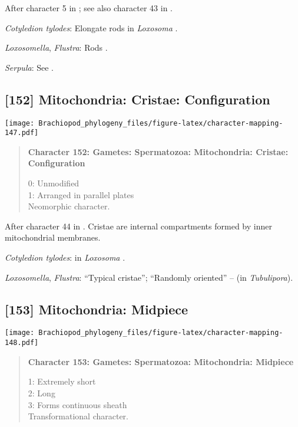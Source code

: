 \documentclass[openany]{book}
\theoremstyle{definition}
\theoremstyle{definition}
\theoremstyle{definition}
\theoremstyle{remark}
\begin{document}
After character 5 in \citet{BucklandNicks2008}; see also character 43 in
\citet{Ponder1997}.

\hypertarget{Cotyledion_tylodes-coding-151}{}
\emph{Cotyledion tylodes}: Elongate rods in \emph{Loxosoma}
\citep{Franzen2000}.

\hypertarget{Flustra-coding-151}{}
\emph{Loxosomella}, \emph{Flustra}: Rods \citep{Franzen1981}.

\hypertarget{Serpula-coding-151}{}
\emph{Serpula}: See \citet{BucklandNicks1988}.

\subsection*{{[}152{]} Mitochondria: Cristae:
Configuration}\label{mitochondria-cristae-configuration}

\texttt{[image: Brachiopod\_phylogeny\_files/figure-latex/character-mapping-147.pdf]}

\begin{quote}
\textbf{Character 152: Gametes: Spermatozoa: Mitochondria: Cristae:
Configuration}

0: Unmodified\\
1: Arranged in parallel plates\\
Neomorphic character.
\end{quote}

After character 44 in \citet{Ponder1997}. Cristae are internal
compartments formed by inner mitochondrial membranes.

\hypertarget{Cotyledion_tylodes-coding-152}{}
\emph{Cotyledion tylodes}: in \emph{Loxosoma} \citep{Franzen2000}.

\hypertarget{Flustra-coding-152}{}
\emph{Loxosomella}, \emph{Flustra}: ``Typical cristae''; ``Randomly
oriented'' -- \citet{Franzen1984} (in \emph{Tubulipora}).

\subsection*{{[}153{]} Mitochondria:
Midpiece}\label{mitochondria-midpiece}

\texttt{[image: Brachiopod\_phylogeny\_files/figure-latex/character-mapping-148.pdf]}

\begin{quote}
\textbf{Character 153: Gametes: Spermatozoa: Mitochondria: Midpiece}

1: Extremely short\\
2: Long\\
3: Forms continuous sheath\\
Transformational character.
\end{quote}
\end{document}
